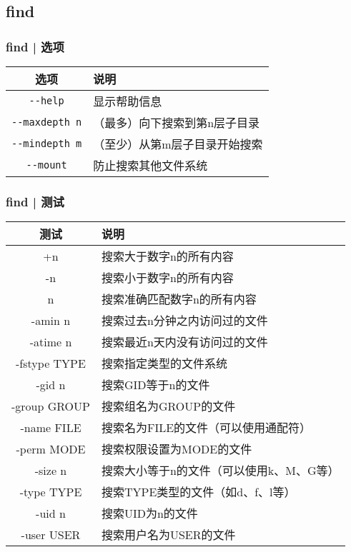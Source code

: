 \subsection{find}
\begin{frame}[fragile]
  \frametitle{find | 选项}
  \begin{table}
    \centering
    \begin{tabularx}{0.9\textwidth}{cX}
      \hline
      \rowcolor{blue!50}选项 & 说明\\
      \hline
      \verb|--help| & 显示帮助信息\\
      \verb|--maxdepth n| & （最多）向下搜索到第n层子目录\\
      \verb|--mindepth m| & （至少）从第m层子目录开始搜索\\
      \verb|--mount| & 防止搜索其他文件系统\\
      \hline
    \end{tabularx}
  \end{table}
\end{frame}

\begin{frame}
  \frametitle{find | \alert{测试}}
  \begin{table}
    \centering
    \begin{tabularx}{0.9\textwidth}{cX}
      \hline
      \rowcolor{blue!50}测试 & 说明\\
      \hline
      +n & 搜索大于数字n的所有内容\\
      -n & 搜索小于数字n的所有内容\\
      n & 搜索准确匹配数字n的所有内容\\
      -amin n & 搜索过去n分钟之内访问过的文件\\
      -atime n & 搜索最近n天内没有访问过的文件\\
      -fstype TYPE & 搜索指定类型的文件系统\\
      -gid n & 搜索GID等于n的文件\\
      -group GROUP & 搜索组名为GROUP的文件\\
      -name FILE & 搜索名为FILE的文件（可以使用通配符）\\
      -perm MODE & 搜索权限设置为MODE的文件\\
      -size n & \small{搜索大小等于n的文件（可以使用k、M、G等）}\\
      -type TYPE & 搜索TYPE类型的文件（如d、f、l等）\\
      -uid n & 搜索UID为n的文件\\
      -user USER & 搜索用户名为USER的文件\\
      \hline
    \end{tabularx}
  \end{table}
\end{frame}

